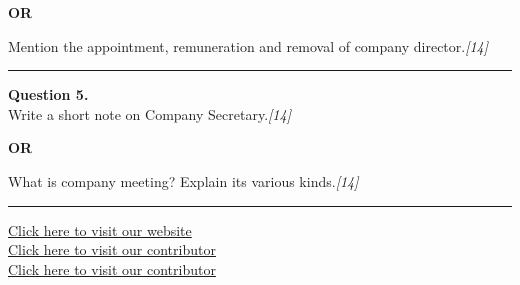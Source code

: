 \documentclass[11pt,a4paper]{article}
\newcommand{\pts}[1]{\hfill   \textit{[#1]}}
\begin{document}
\centerline{   \textbf{OR}}

Mention the appointment, remuneration and removal of company director.\pts{14}

\medskip\rule{\linewidth}{0.2pt}




\noindent   \textbf{Question 5.} \\
Write a short note on Company Secretary.\pts{14}

\centerline{   \textbf{OR}}

What is company meeting? Explain its various kinds.\pts{14}

\vfill
\rule{\linewidth}{0.4pt}

\begin{center}\small
  \href{https://bhu-exam.vercel.app/}{Click here to visit our website}\\[4pt]
  \href{https://me-aryan.vercel.app/}{Click here to visit our contributor}\\[4pt]
  \href{https://quashan-me.vercel.app/}{Click here to visit our contributor}
\end{center}
\end{document}
